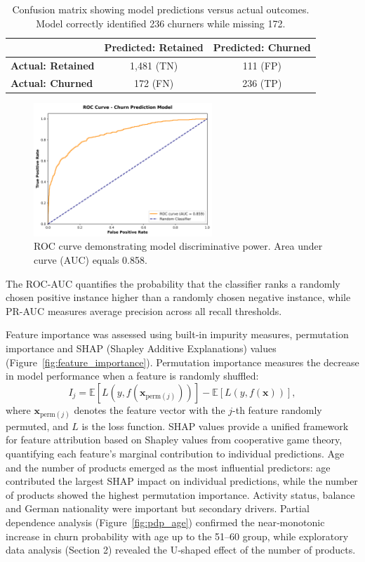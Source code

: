\documentclass[12pt]{article}
\begin{document}
\begin{table}[H]
\centering
\small
\caption{Confusion matrix showing model predictions versus actual outcomes. Model correctly identified 236 churners while missing 172.}
\label{tab:confusion_matrix}
\begin{tabular}{lcc}
\toprule
& \textbf{Predicted: Retained} & \textbf{Predicted: Churned} \\
\midrule
\textbf{Actual: Retained} & 1,481 (TN) & 111 (FP) \\
\textbf{Actual: Churned} & 172 (FN) & 236 (TP) \\
\bottomrule
\end{tabular}
\end{table}

\begin{figure}[H]
\centering
\includegraphics[width=0.6\textwidth]{img/17_roc_curve.png}
\caption{ROC curve demonstrating model discriminative power. Area under curve (AUC) equals 0.858.}
\label{fig:roc_curve}
\end{figure}

The ROC-AUC quantifies the probability that the classifier ranks a randomly chosen positive instance higher than a randomly chosen negative instance, while PR-AUC measures average precision across all recall thresholds.

Feature importance was assessed using built‑in impurity measures, permutation importance and SHAP (Shapley Additive Explanations) values (Figure~\ref{fig:feature_importance}).  Permutation importance measures the decrease in model performance when a feature is randomly shuffled:
\[ I_j = \mathbb{E}[L(y, f(\mathbf{x}_{\text{perm}(j)}))] - \mathbb{E}[L(y, f(\mathbf{x}))], \]
where \(\mathbf{x}_{\text{perm}(j)}\) denotes the feature vector with the \(j\)-th feature randomly permuted, and \(L\) is the loss function.  SHAP values provide a unified framework for feature attribution based on Shapley values from cooperative game theory, quantifying each feature's marginal contribution to individual predictions.  Age and the number of products emerged as the most influential predictors: age contributed the largest SHAP impact on individual predictions, while the number of products showed the highest permutation importance.  Activity status, balance and German nationality were important but secondary drivers.  Partial dependence analysis (Figure~\ref{fig:pdp_age}) confirmed the near‑monotonic increase in churn probability with age up to the 51–60 group, while exploratory data analysis (Section 2) revealed the U‑shaped effect of the number of products.
\end{document}
